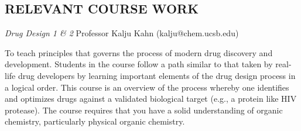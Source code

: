 \documentclass[margin, 10pt]{res} %
\begin{document}
\begin{resume}
\section{RELEVANT COURSE WORK}
{\sl Drug Design 1 \& 2} \hfill Professor Kalju Kahn  (kalju@chem.ucsb.edu)

To teach principles that governs the process of modern drug discovery and development. Students in the course follow a path similar to that taken by real-life drug developers by learning important elements of the drug design process in a logical order.
This course is an overview of the process whereby one identifies and optimizes drugs against a validated biological target (e.g., a protein like HIV protease). The course requires that you have a solid understanding of organic chemistry, particularly physical organic chemistry.

\end{resume}
\end{document}

